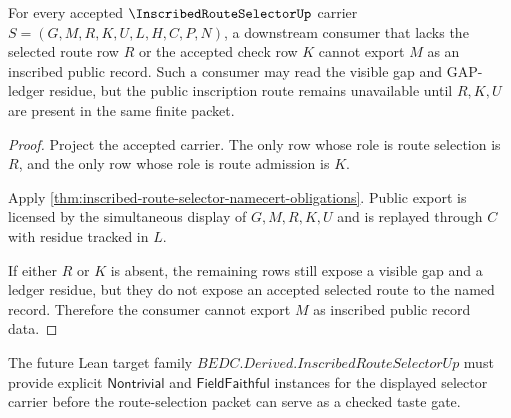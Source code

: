 \begin{theorem}
\label{thm:inscribed-route-selector-nontriviality-prediction}
For every accepted $\InscribedRouteSelectorUp$ carrier $S=(G,M,R,K,U,L,H,C,P,N)$, a downstream consumer that lacks the selected route row $R$ or the accepted check row $K$ cannot export $M$ as an inscribed public record. Such a consumer may read the visible gap and GAP-ledger residue, but the public inscription route remains unavailable until $R,K,U$ are present in the same finite packet.
\end{theorem}
\begin{proof}
Project the accepted carrier. The only row whose role is route selection is $R$, and the only row whose role is route admission is $K$.

Apply \autoref{thm:inscribed-route-selector-namecert-obligations}. Public export is licensed by the simultaneous display of $G,M,R,K,U$ and is replayed through $C$ with residue tracked in $L$.

If either $R$ or $K$ is absent, the remaining rows still expose a visible gap and a ledger residue, but they do not expose an accepted selected route to the named record. Therefore the consumer cannot export $M$ as inscribed public record data.
\end{proof}


The future Lean target family $BEDC.Derived.InscribedRouteSelectorUp$ must provide explicit $\mathsf{Nontrivial}$ and $\mathsf{FieldFaithful}$ instances for the displayed selector carrier before the route-selection packet can serve as a checked taste gate.


